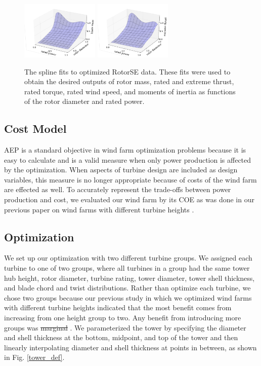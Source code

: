\documentclass[WESD, manuscript]{copernicus}
\providecommand{\DIFadd}[1]{{\protect\color{blue}\uwave{#1}}} %
\providecommand{\DIFdel}[1]{{\protect\color{red}\sout{#1}}}                      %
\providecommand{\DIFaddbegin}{} %
\providecommand{\DIFaddend}{} %
\providecommand{\DIFdelbegin}{} %
\providecommand{\DIFdelend}{} %
\begin{document}
\begin{figure}[htbp]
 \includegraphics[trim={2cm 0 0 0},clip,width=0.33\textwidth]{Figures/blade_mass.pdf}\label{blade_mass}
 \includegraphics[trim={2cm 0 0 0},clip,width=0.33\textwidth]{Figures/extreme_thrust.pdf}\label{extreme_thrust}
  \caption{\label{rotor_nacelle} The spline fits to optimized RotorSE data. These fits were used to obtain the desired outputs of rotor mass, rated and extreme thrust, rated torque, rated wind speed, and moments of inertia as functions of the rotor diameter and rated power.}
\end{figure}

	\subsection{Cost Model}
	\DIFaddbegin 

\DIFaddend AEP is a standard objective in wind farm optimization problems because it is easy to calculate and is a valid measure when only power production is affected by the optimization. When aspects of turbine design are included as design variables, this measure is no longer appropriate because of costs of the wind farm are effected as well. To accurately represent the trade-offs between power production and cost, we evaluated our wind farm by its COE as was done in our previous paper on wind farms with different turbine heights \citep{stanley2018}.              

	\subsection{Optimization}
	\label{sec:optimization}
	We set up our optimization with two different turbine groups. We assigned each turbine to one of two groups, where all turbines in a group had the same tower hub height, rotor diameter, turbine rating, tower diameter, tower shell thickness, and blade chord and twist distributions.
Rather than optimize each turbine, we chose two groups because our previous study in which we optimized wind farms with different turbine heights indicated that the most benefit comes from increasing from one height group to two. Any benefit from introducing more groups was \DIFdelbegin \DIFdel{marginal }\DIFdelend \DIFaddbegin \DIFadd{insignificant }\DIFaddend \citep{stanley2018}. We parameterized the tower by specifying the diameter and shell thickness at the bottom, midpoint, and top of the tower and then linearly interpolating diameter and shell thickness at points in between, as shown in Fig. \ref{tower_def}.
\end{document}
